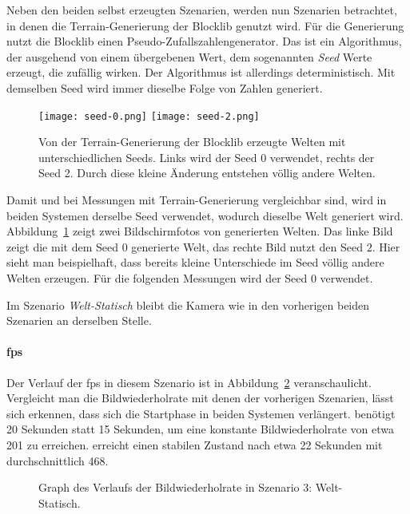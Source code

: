 Neben den beiden selbst erzeugten Szenarien, werden nun Szenarien betrachtet, in denen die Terrain-Generierung der Blocklib genutzt wird. Für die Generierung nutzt die Blocklib einen Pseudo-Zufallszahlengenerator. Das ist ein Algorithmus, der ausgehend von einem übergebenen Wert, dem sogenannten \emph{Seed} Werte erzeugt, die zufällig wirken. Der Algorithmus ist allerdings deterministisch. Mit demselben Seed wird immer dieselbe Folge von Zahlen generiert.

\begin{figure}
	\centering
	\texttt{[image: seed-0.png]}
	\hfill
	\texttt{[image: seed-2.png]}
	\caption[Von der Terrain-Generierung der Blocklib erzeugte Welten mit unterschiedlichen Seeds.]{Von der Terrain-Generierung der Blocklib erzeugte Welten mit unterschiedlichen Seeds. Links wird der Seed 0 verwendet, rechts der Seed 2. Durch diese kleine Änderung entstehen völlig andere Welten.}\label{fig:static}
\end{figure}
Damit \sysA{} und \sysB{} bei Messungen mit Terrain-Generierung vergleichbar sind, wird in beiden Systemen derselbe Seed verwendet, wodurch dieselbe Welt generiert wird. Abbildung~\ref{fig:static} zeigt zwei Bildschirmfotos von generierten Welten. Das linke Bild zeigt die mit dem Seed $0$ generierte Welt, das rechte Bild nutzt den Seed $2$. Hier sieht man beispielhaft, dass bereits kleine Unterschiede im Seed völlig andere Welten erzeugen. Für die folgenden Messungen wird der Seed $0$ verwendet. 

Im Szenario \emph{Welt-Statisch} bleibt die Kamera wie in den vorherigen beiden Szenarien an derselben Stelle.



\paragraph{\ac{fps}}

Der Verlauf der \ac{fps} in diesem Szenario ist in Abbildung~\ref{fig:seed-0-static-fps} veranschaulicht. Vergleicht man die Bildwiederholrate mit denen der vorherigen Szenarien, lässt sich erkennen, dass sich die Startphase in beiden Systemen verlängert. \sysA{} benötigt 20 Sekunden statt 15 Sekunden, um eine konstante Bildwiederholrate von etwa \SI{201}{\fps} zu erreichen. \sysB{} erreicht einen stabilen Zustand nach etwa 22 Sekunden mit durchschnittlich \SI{468}{\fps}.

\begin{figure}[!htbp]
	\caption{Graph des Verlaufs der Bildwiederholrate in Szenario 3: Welt-Statisch.}\label{fig:seed-0-static-fps}
\end{figure}

